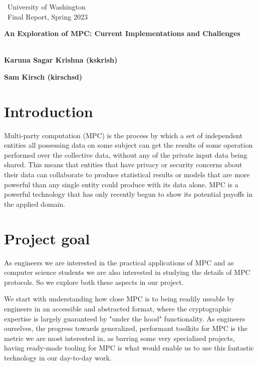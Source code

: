 \documentclass[11pt]{article}
\begin{document}
\hfill\ {University of Washington}\\
\hfill\ {Final Report, Spring 2023}\\
\bigskip

\begin{center}
{\bf \color{boldcolor} \LARGE An Exploration of MPC: Current Implementations and Challenges}
\medskip

\noindent {\bf }\\
          {\bf Karuna Sagar Krishna (kskrish)}

          {\bf Sam Kirsch (kirschsd)}
\end{center}
\bigskip


\section*{Introduction}

Multi-party computation (MPC) is the process by which a set of independent entities all possessing data on some subject can get 
the results of some operation performed over the collective data, without any of the private input data being shared. 
This means that entities that have privacy or security concerns about their data can collaborate to produce 
statistical results or models that are more powerful than any single entity could produce with its data alone. MPC is a powerful technology 
that has only recently begun to show its potential payoffs in the applied domain.

\section*{Project goal}

As engineers we are interested in the practical applications of MPC and as computer science students we are also interested in studying the details of MPC protocols. So we explore both these aspects in our project.

We start with understanding how close MPC is to being readily useable by engineers in an accessible and abstracted format, where the cryptographic expertise is largely guaranteed by "under the hood" functionality. As engineers ourselves, the progress towards generalized, performant toolkits for MPC is the metric we are most interested in, as barring some very specialized projects, having ready-made tooling for MPC is what would enable us to use this fantastic technology in our day-to-day work.
\end{document}
